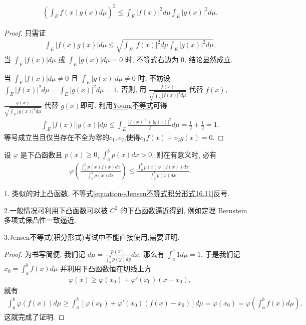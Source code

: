 \documentclass[../../main.tex]{subfiles}
\begin{document}
\begin{theorem}[Cauchy不等式]\label{theorem:Cauchy不等式(一般版本)}
\begin{align*}
\left(\int_E f(x)g(x) d\mu\right)^2 \leqslant \int_E |f(x)|^2 d\mu \int_E |g(x)|^2 d\mu.
\end{align*} 
\end{theorem}
\begin{proof}
只需证
\begin{align*}
\int_E |f(x)g(x)| d\mu \leqslant \sqrt{\int_E |f(x)|^2 d\mu \int_E |g(x)|^2 d\mu}.
\end{align*}
当 $\int_E |f(x)| d\mu$ 或 $\int_E |g(x)| d\mu = 0$ 时, 不等式右边为 $0$, 结论显然成立.

当 $\int_E |f(x)| d\mu \ne 0$ 且 $\int_E |g(x)| d\mu \ne 0$ 时, 不妨设 $\int_E |f(x)|^2 d\mu = \int_E |g(x)|^2 d\mu = 1$, 否则, 用 $\frac{f(x)}{\sqrt{\int_E |f(x)|^2 d\mu}}$ 代替 $f(x)$, $\frac{g(x)}{\sqrt{\int_E |g(x)|^2 d\mu}}$ 代替 $g(x)$即可.
利用\hyperref[theorem:Young不等式初等形式]{Young不等式}可得
\begin{align*}
\int_E |f(x)||g(x)| d\mu \leqslant \int_E \frac{|f(x)|^2 + |g(x)|^2}{2} d\mu = \frac{1}{2} + \frac{1}{2} = 1.
\end{align*}
等号成立当且仅当存在不全为零的$c_1,c_2$,使得$c_1f(x)+c_2g(x)=0.$
\end{proof}

\begin{theorem}\label{theorem:Jensen不等式积分形式}
设 $\varphi$ 是下凸函数且 $p(x) \geqslant 0$, $\int_a^b p(x) dx > 0$, 则在有意义时, 必有
\begin{align}\label{equation--Jensen不等式积分形式16.11}
\varphi\left(\frac{\int_a^b p(x)f(x)dx}{\int_a^b p(x)dx}\right) \leqslant \frac{\int_a^b p(x)\varphi(f(x))dx}{\int_a^b p(x)dx}.
\end{align}
\end{theorem}
\begin{note}
1. 类似的对上凸函数, 不等式\eqref{equation--Jensen不等式积分形式16.11}反号.

2.一般情况可利用下凸函数可以被 $C^2$ 的下凸函数逼近得到, 例如定理 Bernstein 多项式保凸性一致逼近. 

3.Jensen不等式(积分形式)考试中不能直接使用,需要证明.
\end{note}
\begin{proof}
为书写简便, 我们记 $d\mu = \frac{p(x)}{\int_a^b p(y)dy}dx$, 那么有 $\int_a^b 1d\mu = 1$. 于是我们记 $x_0 = \int_a^b f(x)d\mu$ 并利用下凸函数恒在切线上方
\begin{align*}
\varphi(x) \geqslant \varphi(x_0) + \varphi'(x_0)(x - x_0),
\end{align*}
就有
\begin{align*}
\int_a^b \varphi(f(x))d\mu \geqslant \int_a^b [\varphi(x_0) + \varphi'(x_0)(f(x) - x_0)]d\mu = \varphi(x_0) = \varphi\left(\int_a^b f(x)d\mu\right),
\end{align*}
这就完成了证明. 
\end{proof}
\end{document}
